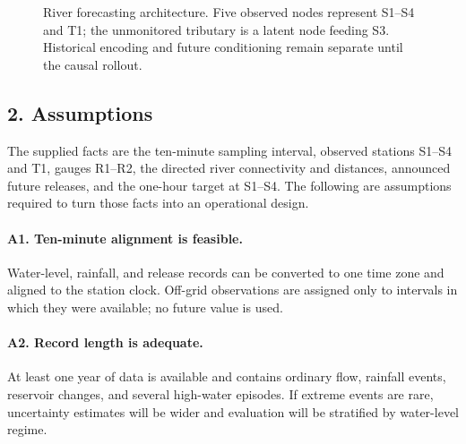 \documentclass{article}
\begin{document}
\begin{figure}[htbp]
{
}
\caption*{River forecasting architecture. Five observed nodes represent S1--S4 and T1; the unmonitored tributary is a latent node feeding S3. Historical encoding and future conditioning remain separate until the causal rollout.}
\end{figure}

\subsection*{2. Assumptions}

The supplied facts are the ten-minute sampling interval, observed stations S1--S4 and T1, gauges R1--R2, the directed river connectivity and distances, announced future releases, and the one-hour target at S1--S4. The following are assumptions required to turn those facts into an operational design.

\paragraph{A1. Ten-minute alignment is feasible.}
Water-level, rainfall, and release records can be converted to one time zone and aligned to the station clock. Off-grid observations are assigned only to intervals in which they were available; no future value is used.

\paragraph{A2. Record length is adequate.}
At least one year of data is available and contains ordinary flow, rainfall events, reservoir changes, and several high-water episodes. If extreme events are rare, uncertainty estimates will be wider and evaluation will be stratified by water-level regime.
\end{document}
